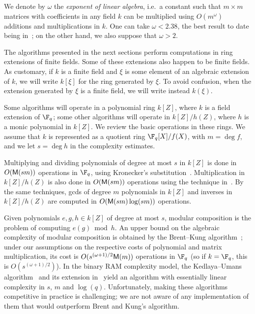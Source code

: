 We denote by $\omega$ the \emph{exponent of linear algebra}, i.e.\ a
constant such that $m\times m$ matrices with coefficients in any field
$k$ can be multiplied using $O(m^\omega)$ additions and
multiplications in $k$. One can take $\omega < 2.38$, the best result
to date being in~\cite{LeGall14}; on the other hand, we also suppose
that $\omega > 2$.

The algorithms presented in the next sections perform computations in
ring extensions of finite fields. Some of these extensions also happen
to be finite fields. As customary, if $k$ is a finite field and $\xi$
is some element of an algebraic extension of $k$, we will write
$k[\xi]$ for the ring generated by $\xi$. To avoid confusion, when the
extension generated by $\xi$ is a finite field, we will write instead
$k(\xi)$.

Some algorithms will operate in a polynomial ring $k[Z]$, where $k$ is
a field extension of $\F_q$; some other algorithms will operate in
$k[Z]/h(Z)$, where $h$ is a monic polynomial in $k[Z]$. We review the
basic operations in these rings. We assume that $k$ is represented as
a quotient ring $\F_q[X]/f(X)$, with $m=\deg f$, and we let $s=\deg h$
in the complexity estimates.

Multiplying and dividing polynomials of degree at most $s$ in $k[Z]$
is done in $O(\mathsf{M}(sm))$ operations in $\F_q$, using Kronecker's
substitution~\cite{moenck76,kaltofen87,vzGG,vzgathen+shoup92:journal,harvey09}.
Multiplication in $k[Z]/h(Z)$ is also done in $O(\mathsf{M}(sm))$ operations using the
technique in~\cite{pascal+schost06}. By the same techniques, gcds of
degree $m$ polynomials in $k[Z]$ and inverses in $k[Z]/h(Z)$ are
computed in $O(\mathsf{M}(sm)\log(sm))$ operations.

Given polynomials $e,g,h \in k[Z]$ of degree at most $s$, modular
composition is the problem of computing $e(g) \bmod h$. An upper bound
on the algebraic complexity of modular composition is obtained by the
Brent--Kung algorithm~\cite{brent+kung}; under our assumptions on the
respective costs of polynomial and matrix multiplication, its cost is
$O(s^{(\omega+1)/2}\mathsf{M}(m))$ operations in $\F_q$
(so if $k=\F_q$, this is $O(s^{(\omega+1)/2})$). In the binary RAM
complexity model, the Kedlaya--Umans algorithm~\cite{KeUm11} and its
extension in~\cite{PoSc13a} yield an algorithm with essentially linear
complexity in $s$, $m$ and $\log(q)$. Unfortunately, making these
algorithms competitive in practice is challenging; we are not aware of
any implementation of them that would outperform Brent and Kung's
algorithm. 

